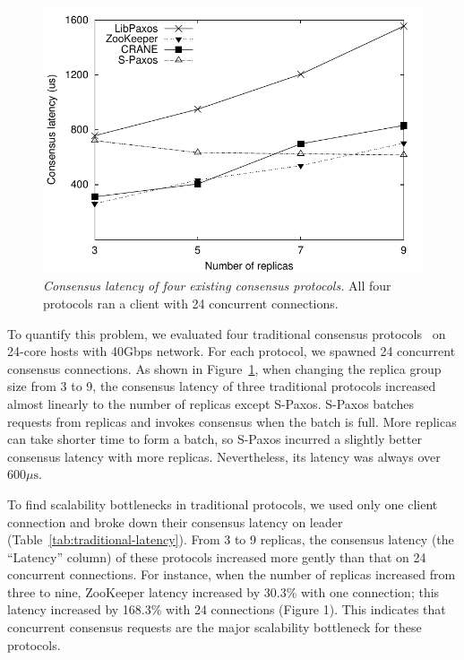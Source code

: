 \documentclass[10pt,onecolumn,letterpaper]{article}
\newcommand{\zookeeper}{ZooKeeper\xspace}
\newcommand{\us}[0]{\(\mu\text{s}\)\xspace}
\begin{document}
\begin{sloppypar}
\begin{figure}[ht]
\begin{center}
\includegraphics{figures/paxos_latency}
\caption{{\em Consensus latency of four existing consensus protocols.} All four 
protocols ran a client with 24 concurrent connections.}\label{fig:paxos_latency}
\end{center}
\end{figure}

To quantify this problem, we evaluated four traditional consensus 
protocols~\cite{zookeeper, spaxos:srds12, crane:sosp15, libpaxos} on 24-core 
hosts with 40Gbps network. For each protocol, we spawned 24 concurrent 
consensus connections. As shown in Figure~\ref{fig:paxos_latency}, when 
changing the replica group size from 3 to 9, the consensus latency of three 
traditional protocols increased almost linearly to the number of replicas except 
S-Paxos. S-Paxos batches requests from replicas and invokes consensus when the 
batch is full. More replicas can take shorter time to form a batch, so S-Paxos 
incurred a slightly better consensus latency with more replicas. Nevertheless, 
its latency was always over 600\us.

To find scalability bottlenecks in traditional protocols, we used only one 
client connection and broke down their consensus latency on leader 
(Table~\ref{tab:traditional-latency}). From 3 to 9 replicas, the consensus 
latency (the ``Latency'' column) of these protocols increased more gently than 
that on 24 concurrent connections. For instance, when the number of replicas 
increased from three to nine, \zookeeper latency increased by 30.3\% with one 
connection; this latency increased by 168.3\% with 24 connections (Figure 1). 
This indicates that concurrent consensus requests are the major scalability 
bottleneck for these protocols.


\end{sloppypar}
\end{document}
